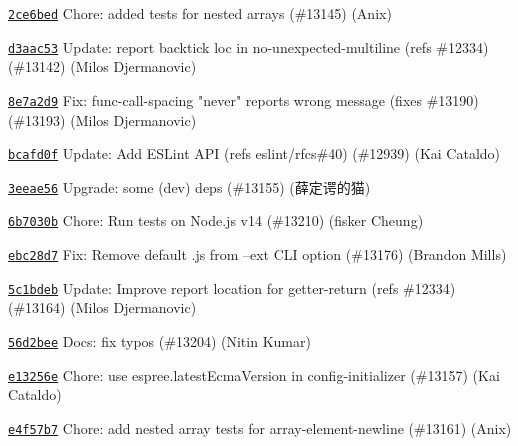 \begin{DoxyItemize}
\item \href{https://github.com/eslint/eslint/commit/2ce6bed04cad376003f70447ece4b6578c142bfd}{\texttt{ {\ttfamily 2ce6bed}}} Chore\+: added tests for nested arrays (\#13145) (Anix)
\item \href{https://github.com/eslint/eslint/commit/d3aac532f6a24c633f85dedf0e552eabd22d0956}{\texttt{ {\ttfamily d3aac53}}} Update\+: report backtick loc in no-\/unexpected-\/multiline (refs \#12334) (\#13142) (Milos Djermanovic)
\item \href{https://github.com/eslint/eslint/commit/8e7a2d93595cfe0c1597af0e7873853369251c0b}{\texttt{ {\ttfamily 8e7a2d9}}} Fix\+: func-\/call-\/spacing "{}never"{} reports wrong message (fixes \#13190) (\#13193) (Milos Djermanovic)
\item \href{https://github.com/eslint/eslint/commit/bcafd0f8508e19ab8087a35fac7b97fc4295df3e}{\texttt{ {\ttfamily bcafd0f}}} Update\+: Add ESLint API (refs eslint/rfcs\#40) (\#12939) (Kai Cataldo)
\item \href{https://github.com/eslint/eslint/commit/3eeae565bfb0834a31e5d3a253a17bbf4027cf88}{\texttt{ {\ttfamily 3eeae56}}} Upgrade\+: some (dev) deps (\#13155) (薛定谔的猫)
\item \href{https://github.com/eslint/eslint/commit/6b7030b1a1e1e3d1a3953cfa9722074d6a6fc1a9}{\texttt{ {\ttfamily 6b7030b}}} Chore\+: Run tests on Node.\+js v14 (\#13210) (fisker Cheung)
\item \href{https://github.com/eslint/eslint/commit/ebc28d76658f1f3e4e8d56e70a25752b5d4a6686}{\texttt{ {\ttfamily ebc28d7}}} Fix\+: Remove default .js from --ext CLI option (\#13176) (Brandon Mills)
\item \href{https://github.com/eslint/eslint/commit/5c1bdebcf728062fd41583886830c89b65485df9}{\texttt{ {\ttfamily 5c1bdeb}}} Update\+: Improve report location for getter-\/return (refs \#12334) (\#13164) (Milos Djermanovic)
\item \href{https://github.com/eslint/eslint/commit/56d2beea0ea0b6395a6d4a3e116ea6a964ff92f3}{\texttt{ {\ttfamily 56d2bee}}} Docs\+: fix typos (\#13204) (Nitin Kumar)
\item \href{https://github.com/eslint/eslint/commit/e13256e395cc413ce45a66c8562621d48440d8f4}{\texttt{ {\ttfamily e13256e}}} Chore\+: use espree.\+latest\+Ecma\+Version in config-\/initializer (\#13157) (Kai Cataldo)
\item \href{https://github.com/eslint/eslint/commit/e4f57b7d7b8b7441a2217a217dcda1e7bfff516a}{\texttt{ {\ttfamily e4f57b7}}} Chore\+: add nested array tests for array-\/element-\/newline (\#13161) (Anix)

\end{DoxyItemize}
